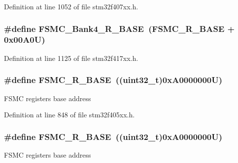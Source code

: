 Definition at line 1052 of file stm32f407xx.\+h.

\subsubsection[{\texorpdfstring{F\+S\+M\+C\+\_\+\+Bank4\+\_\+\+R\+\_\+\+B\+A\+SE}{FSMC_Bank4_R_BASE}}]{\setlength{\rightskip}{0pt plus 5cm}\#define F\+S\+M\+C\+\_\+\+Bank4\+\_\+\+R\+\_\+\+B\+A\+SE~({\bf F\+S\+M\+C\+\_\+\+R\+\_\+\+B\+A\+SE} + 0x00\+A0\+U)}\hypertarget{group___peripheral__registers__structures_gaf9e5417133160b0bdd0498d982acec19}{}\label{group___peripheral__registers__structures_gaf9e5417133160b0bdd0498d982acec19}


Definition at line 1125 of file stm32f417xx.\+h.

\subsubsection[{\texorpdfstring{F\+S\+M\+C\+\_\+\+R\+\_\+\+B\+A\+SE}{FSMC_R_BASE}}]{\setlength{\rightskip}{0pt plus 5cm}\#define F\+S\+M\+C\+\_\+\+R\+\_\+\+B\+A\+SE~((uint32\+\_\+t)0x\+A0000000\+U)}\hypertarget{group___peripheral__registers__structures_gaddf0e199dccba83272b20c9fb4d3aaed}{}\label{group___peripheral__registers__structures_gaddf0e199dccba83272b20c9fb4d3aaed}
F\+S\+MC registers base address 

Definition at line 848 of file stm32f405xx.\+h.

\subsubsection[{\texorpdfstring{F\+S\+M\+C\+\_\+\+R\+\_\+\+B\+A\+SE}{FSMC_R_BASE}}]{\setlength{\rightskip}{0pt plus 5cm}\#define F\+S\+M\+C\+\_\+\+R\+\_\+\+B\+A\+SE~((uint32\+\_\+t)0x\+A0000000\+U)}\hypertarget{group___peripheral__registers__structures_gaddf0e199dccba83272b20c9fb4d3aaed}{}\label{group___peripheral__registers__structures_gaddf0e199dccba83272b20c9fb4d3aaed}
F\+S\+MC registers base address 

